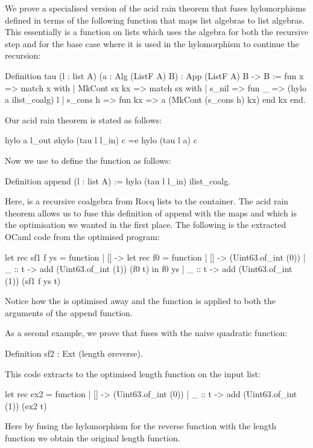 \documentclass[a4paper,UKenglish,cleveref, autoref, thm-restate]{lipics-v2021}
\begin{document}
We prove a specialised version of the acid rain theorem that fuses
hylomorphisms defined in terms of the following function  that maps
list algebras to list algebras.  This essentially is a function on lists which
uses the algebra for both the recursive step and for the base case where it is
used in the hylomorphism to continue the recursion:
\begin{coqcode}
Definition tau (l : list A) (a : Alg (ListF A) B) : App (ListF A) B -> B :=
  fun x => match x with | MkCont sx kx => match sx with
  | s_nil => fun _ => (hylo a ilist_coalg) l
  | s_cons h => fun kx => a (MkCont (s_cons h) kx)
  end kx end.
\end{coqcode}
Our acid rain theorem is stated as follows:
\begin{coqcode}
  hylo a l_out \o hylo (tau l l_in) c =e hylo (tau l a) c
\end{coqcode}
Now we use  to define the  function as follows:
\begin{coqcode}
Definition append (l : list A) := hylo (tau l l_in) ilist_coalg.
\end{coqcode}
Here,  is a recursive coalgebra from Rocq lists to the
 container. The acid rain theorem allows us to fuse this definition
of append with the maps  and  which is the optimisation we
wanted in the first place. The following is the extracted OCaml code from the
optimised program:
\begin{ocamlcode}
let rec sf1 f ys =
  function | [] -> let rec f0 = function
                   | [] -> (Uint63.of_int (0))
                   | _ :: t -> add (Uint63.of_int (1)) (f0 t)
                   in f0 ys
           | _ :: t -> add (Uint63.of_int (1)) (sf1 f ys t)
\end{ocamlcode}
Notice how the  is optimised away and the function  is
applied to both the arguments of the append function.

As a second example, we prove that  fuses with
the naive quadratic  function:
\begin{coqcode}
Definition sf2 : Ext (length \o reverse).
\end{coqcode}
This code extracts to the optimised length function on the input list:
\begin{ocamlcode}
let rec ex2 = function | [] -> (Uint63.of_int (0))
                       | _ :: t -> add (Uint63.of_int (1)) (ex2 t)
\end{ocamlcode}
Here by fusing the hylomorphism for the reverse function with the length
function we obtain the original length function.
\end{document}
